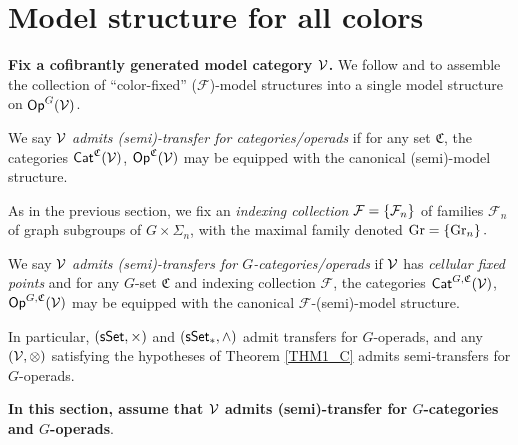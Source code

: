 \documentclass[a4paper,10pt
,draft
]{article}%
\renewcommand{\F}{\mathcal F}
\renewcommand{\1}{\ensuremath{\mathbb{id}}}
\begin{document}
\newpage

\section{Model structure for all colors} 
\renewcommand{\C}{\mathfrak C}

\textbf{Fix a cofibrantly generated model category $\mathcal V$.}
We follow \cite{BM13} and \cite{Cav14} to assemble the collection of ``color-fixed''
($\F$)-model structures into
a single model structure on $\mathsf{Op}^G(\mathcal V)$.


\begin{definition}
      We say $\mathcal V$ \textit{admits (semi)-transfer for categories/operads} if for any set $\mathfrak C$,
      the categories $\mathsf{Cat}^{\mathfrak C}(\mathcal V)$, $\mathsf{Op}^{\mathfrak C}(\mathcal V)$
      may be equipped with the canonical (semi)-model structure.
\end{definition}

As in the previous section, we fix an \textit{indexing collection} $\F = \set{\F_n}$ of families $\F_n$ of graph subgroups of $G \times \Sigma_n$,
with the maximal family denoted $\mathrm{Gr} = \left\{\mathrm{Gr}_n\right\}.$

\begin{definition}
      We say $\mathcal V$ \textit{admits (semi)-transfers for $G$-categories/operads} if
      $\mathcal V$ has \textit{cellular fixed points} and
      for any $G$-set $\mathfrak C$ and indexing collection $\F$,
      the categories $\mathsf{Cat}^{G, \mathfrak C}(\mathcal V)$, $\mathsf{Op}^{G, \mathfrak C}(\mathcal V)$
      may be equipped with the canonical $\F$-(semi)-model structure.
\end{definition}

\begin{remark}
      In particular, $(\mathsf{sSet}, \times)$ and $(\sSet_{\**}, \wedge)$ admit transfers for $G$-operads,
      and any $(\mathcal V, \otimes)$ satisfying the hypotheses of Theorem \ref{THM1_C} admits semi-transfers for $G$-operads.
\end{remark}

\textbf{\color{OliveGreen} In this section, assume that $\mathcal V$ admits (semi)-transfer for $G$-categories and $G$-operads}.
\end{document}
